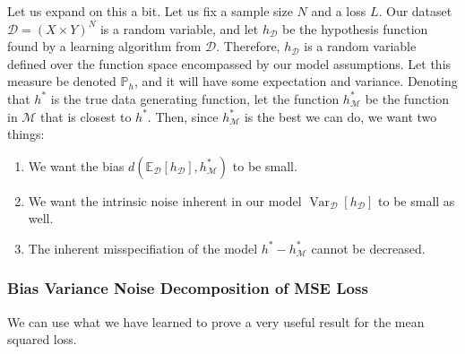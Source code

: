 \documentclass{article}
\DeclareMathOperator{\Var}{Var}
\theoremstyle{definition}
\theoremstyle{remark}
\theoremstyle{definition}
\begin{document}
Let us expand on this a bit. Let us fix a sample size $N$ and a loss $L$. Our dataset $\mathcal{D} = (X \times Y)^N$ is a random variable, and let $h_\mathcal{D}$ be the hypothesis function found by a learning algorithm from $\mathcal{D}$. Therefore, $h_{\mathcal{D}}$ is a random variable defined over the function space encompassed by our model assumptions. Let this measure be denoted $\mathbb{P}_h$, and it will have some expectation and variance. Denoting that $h^\ast$ is the true data generating function, let the function $h^\ast_\mathcal{M}$ be the function in $\mathcal{M}$ that is closest to $h^\ast$. Then, since $h_\mathcal{M}^\ast$ is the best we can do, we want two things: 
\begin{enumerate}
    \item We want the bias $d(\mathbb{E}_\mathcal{D} [ h_\mathcal{D}], h^\ast_\mathcal{M})$ to be small. 
    \item We want the intrinsic noise inherent in our model $\Var_\mathcal{D} [h_\mathcal{D}]$ to be small as well. 
    \item The inherent misspecifiation of the model $h^\ast - h^\ast_{\mathcal{M}}$ cannot be decreased. 
\end{enumerate}

\subsubsection{Bias Variance Noise Decomposition of MSE Loss}

We can use what we have learned to prove a very useful result for the mean squared loss. 
\end{document}
